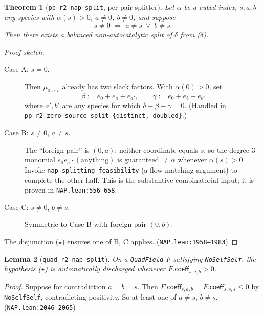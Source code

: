 \documentclass[11pt]{article}
\newtheorem{theorem}{Theorem}
\newtheorem{lemma}[theorem]{Lemma}
\newcommand{\coef}{\mathsf{coeff}}
\newcommand{\slack}{0}
\begin{document}
\begin{theorem}[\texttt{pp\_r2\_nap\_split}, per-pair splitter]
\label{thm:per-pair}
Let $\alpha$ be a cubed index, $s, a, b$ any species with
$\alpha(s) > 0$, $a \ne \slack$, $b \ne \slack$, and suppose
\begin{equation}
    s \ne \slack \;\Longrightarrow\; a \ne s \;\lor\; b \ne s.
    \tag{$\star$}
\end{equation}
Then there exists a balanced non-autocatalytic split of
$\delta$ from ($\delta$).
\end{theorem}
\begin{proof}[Proof sketch]\leavevmode
\begin{description}
  \item[Case A: $s = \slack$.]
    Then $\mu_{\slack, a, b}$ already has two slack factors. With
    $\alpha(\slack) > 0$, set
    \[
        \beta := e_\slack + e_a + e_{a'},\qquad
        \gamma := e_\slack + e_b + e_{b'}
    \]
    where $a', b'$ are any species for which $\delta - \beta - \gamma = 0$.
    (Handled in \texttt{pp\_r2\_zero\_source\_split\_\{distinct, doubled\}}.)

  \item[Case B: $s \ne \slack$, $a \ne s$.]
    The ``foreign pair'' is $(\slack, a)$: neither coordinate equals $s$,
    so the degree-$3$ monomial $e_\slack e_a \cdot (\text{anything})$ is
    guaranteed $\ne \alpha$ whenever $\alpha(s) > 0$.
    Invoke \verb|nap_splitting_feasibility| (a flow-matching argument)
    to complete the other half. This is the substantive combinatorial
    input; it is proven in \texttt{NAP.lean:556--658}.

  \item[Case C: $s \ne \slack$, $b \ne s$.]
    Symmetric to Case B with foreign pair $(\slack, b)$.
\end{description}
The disjunction ($\star$) ensures one of B, C applies.
\hfill (\texttt{NAP.lean:1958--1983})
\end{proof}

\begin{lemma}[\texttt{quad\_r2\_nap\_split}]
\label{lem:quad-split}
On a \verb|QuadField| $F$ satisfying \verb|NoSelfSelf|, the hypothesis
($\star$) is \emph{automatically} discharged whenever
$F.\coef_{s,a,b} > 0$.
\end{lemma}
\begin{proof}
Suppose for contradiction $a = b = s$. Then
$F.\coef_{s, a, b} = F.\coef_{s,s,s} \le 0$ by \verb|NoSelfSelf|,
contradicting positivity. So at least one of $a \ne s$, $b \ne s$.
\hfill (\texttt{NAP.lean:2046--2065})
\end{proof}
\end{document}
